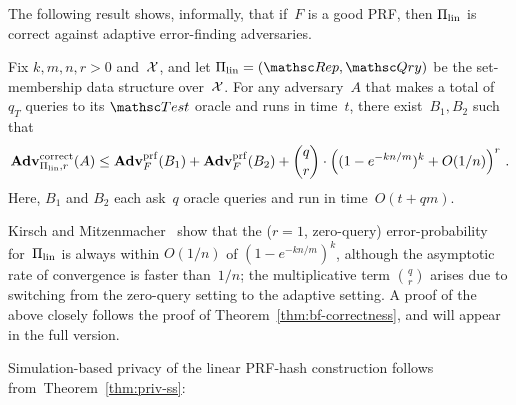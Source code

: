 

 The following result shows, informally, that
if~$F$ is a good PRF, then $\Pi_{\mathrm{lin}}$ is correct
against adaptive error-finding adversaries.


\begin{theorem}%
\label{thm1}\label{thm:lin-correctness} Fix $k,m,n,r>0$ and~${\cal X}$,
and let $\setprim_{\mathrm{lin}}= (\Rep, \Qry)$ be the
set-membership data structure over~${\cal X}$.  For any adversary~$A$
that makes a total of~$q_T$ queries to its $\Test$ oracle and runs
in time~$t$, there exist~$B_1,B_2$ such that
\[
\mathrm{\mathbf{Adv}}^{\mathrm{correct}}_{\Pi_{\mathrm{lin}},r}(A) \leq  \mathbf{Adv}^{\mathrm{prf}}_{F}(B_1) + \mathbf{Adv}^{\mathrm{prf}}_{F}(B_2)  +{\dbinom{q}{r}} \cdot \left( (1-e^{-kn/m})^k + O(1/n) \right)^r\,.
\]
Here, $B_1$ and $B_2$ each ask~$q$ oracle queries and run in
time~$O(t+qm)$.
\end{theorem}
Kirsch and Mitzenmacher~\cite{kirsch2006less} show that the ($r=1$,
zero-query) error-probability for~$\Pi_\mathrm{lin}$ is always
within $O(1/n)$ of $(1-e^{-kn/m})^k$, although the asymptotic rate
of convergence is faster than~$1/n$; the multiplicative term
$\binom{q}{r}$ arises due to switching from the zero-query setting
to the adaptive setting. A proof of the above closely follows the
proof of Theorem~\ref{thm:bf-correctness}, and will appear in the
full version.
%


 Simulation-based privacy of the linear PRF-hash
construction follows from~Theorem~\ref{thm:priv-ss}:


